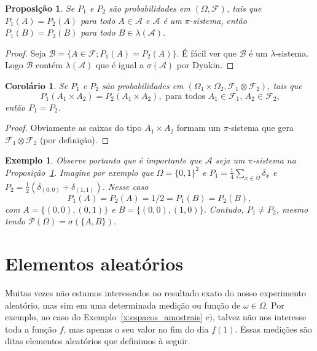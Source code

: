 \documentclass[reqno, draft]{book}
\newcommand*\1{\mathds{1}}
\newtheorem{corollary}[theorem]{Corolário}
\newtheorem{proposition}[theorem]{Proposição}
\newtheorem{example}{Exemplo}[section]
\begin{document}
\begin{proposition}
  \label{p:P12_equal_pi}
  Se $P_1$ e $P_2$ são probabilidades em $(\Omega, \mathcal{F})$, tais que $P_1(A) = P_2(A)$ para todo $A \in \mathcal{A}$ e $\mathcal{A}$ é um $\pi$-sistema, então $P_1(B) = P_2(B)$ para todo $B \in \lambda(\mathcal{A})$.
\end{proposition}

\begin{proof}
  Seja $\mathcal{B} = \{A \in \mathcal{F}; P_1(A) = P_2(A)\}$.
  É fácil ver que $\mathcal{B}$ é um $\lambda$-sistema.
  Logo $\mathcal{B}$ contém $\lambda(\mathcal{A})$ que é igual a $\sigma(\mathcal{A})$ por Dynkin.
\end{proof}

\begin{corollary}
  \label{c:produto_e_unico}
  Se $P_1$ e $P_2$ são probabilidades em $(\Omega_1 \times \Omega_2, \mathcal{F}_1 \otimes \mathcal{F}_2)$, tais que
  \begin{equation}
    P_1(A_1 \times A_2) = P_2(A_1 \times A_2), \text{ para todos $A_1 \in \mathcal{F}_1$, $A_2 \in \mathcal{F}_2$,}
  \end{equation}
  então $P_1 = P_2$.
\end{corollary}

\begin{proof}
  Obviamente as caixas do tipo $A_1 \times A_2$ formam um $\pi$-sistema que gera $\mathcal{F}_1 \otimes \mathcal{F}_2$ (por definição).
\end{proof}

\begin{example}
  Observe portanto que é importante que $\mathcal{A}$ seja um $\pi$-sistema na Proposição~\ref{p:P12_equal_pi}.
  Imagine por exemplo que $\Omega = \{0,1\}^2$ e $P_1 = \tfrac 14 \sum_{x \in \Omega} \delta_x$ e $P_2 = \tfrac 12 (\delta_{(0,0)} + \delta_{(1,1)})$.
  Nesse caso
  \begin{equation}
    P_1(A) = P_2(A) = 1/2 = P_1(B) = P_2(B),
  \end{equation}
  com $A = \{(0,0), (0,1)\}$ e $B = \{(0,0), (1,0)\}$.
  Contudo, $P_1 \neq P_2$, mesmo tendo $\mathcal{P}(\Omega) = \sigma(\{A,B\})$.
\end{example}


\section{Elementos aleatórios}

Muitas vezes não estamos interessados no resultado exato do nosso experimento aleatório, mas sim em uma determinada medição ou função de $\omega \in \Omega$.
Por exemplo, no caso do Exemplo~\ref{x:espacos_amostrais} $c)$, talvez não nos interesse toda a função $f$, mas apenas o seu valor no fim do dia $f(1)$.
Essas medições são ditas elementos aleatórios que definimos à seguir.
\end{document}
